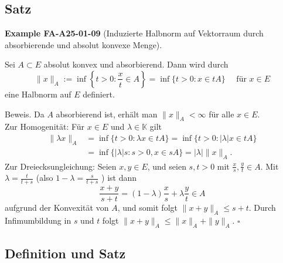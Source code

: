\documentclass[10pt, letterpaper]{article}
\newcommand{\CustomHeading}[3]{%
  \par\medskip\noindent%
  \textbf{#1 #2} \textnormal{(#3)}.\enskip%
}
\newenvironment{EXA}[2]{\begin{unitbox}\CustomHeading{Example}{#1}{#2}}{\end{unitbox}}
\begin{document}
\subsection*{Satz}



\begin{EXA}{FA-A25-01-09}{Induzierte Halbnorm auf Vektorraum durch absorbierende und absolut konvexe Menge}
Sei $A \subset E$ absolut konvex und absorbierend. Dann wird durch
$$
\|x\|_{A}:=\inf \left\{t>0: \frac{x}{t} \in A\right\}=\inf \{t>0: x \in t A\} \quad \text { für } x \in E
$$
eine Halbnorm auf $E$ definiert.


Beweis. Da $A$ absorbierend ist, erhält man $\|x\|_{A}<\infty$ für alle $x \in E$.\\
Zur Homogenität: Für $x \in E$ und $\lambda \in \mathbb{K}$ gilt
$$
\begin{aligned}
\|\lambda x\|_{A} & =\inf \{t>0: \lambda x \in t A\}=\inf \{t>0:|\lambda| x \in t A\} \\
& =\inf \{|\lambda| s: s>0, x \in s A\}=|\lambda|\|x\|_{A} .
\end{aligned}
$$
Zur Dreiecksungleichung: Seien $x, y \in E$, und seien $s, t>0$ mit $\frac{x}{s}, \frac{y}{t} \in A$. Mit $\lambda=\frac{t}{t+s}$ (also $1-\lambda=\frac{s}{t+s}$ ) ist dann
$$
\frac{x+y}{s+t}=(1-\lambda) \frac{x}{s}+\lambda \frac{y}{t} \in A
$$
aufgrund der Konvexität von $A$, und somit folgt $\|x+y\|_{A} \leq s+t$. Durch Infimumbildung in $s$ und $t$ folgt $\|x+y\|_{A} \leq\|x\|_{A}+\|y\|_{A}$. \(\square\)
\end{EXA}




\subsection*{Definition und Satz}
\end{document}

